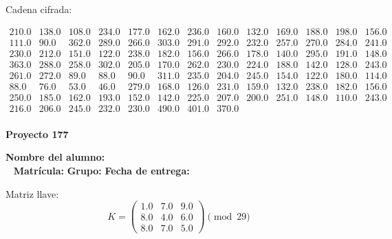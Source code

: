 \documentclass[12pt]{article}
\begin{document}
Cadena cifrada:
\begin{center}
$\begin{array}{lllllllllllll}
210.0 & 138.0 & 108.0 & 234.0 & 177.0 & 162.0 & 236.0 & 160.0 & 132.0 & 169.0 & 188.0 & 198.0 & 156.0\\
111.0 & 90.0 & 362.0 & 289.0 & 266.0 & 303.0 & 291.0 & 292.0 & 232.0 & 257.0 & 270.0 & 284.0 & 241.0\\
230.0 & 212.0 & 151.0 & 122.0 & 238.0 & 182.0 & 156.0 & 266.0 & 178.0 & 140.0 & 295.0 & 191.0 & 148.0\\
363.0 & 288.0 & 258.0 & 302.0 & 205.0 & 170.0 & 262.0 & 230.0 & 224.0 & 188.0 & 142.0 & 128.0 & 243.0\\
261.0 & 272.0 & 89.0 & 88.0 & 90.0 & 311.0 & 235.0 & 204.0 & 245.0 & 154.0 & 122.0 & 180.0 & 114.0\\
88.0 & 76.0 & 53.0 & 46.0 & 279.0 & 168.0 & 126.0 & 231.0 & 159.0 & 132.0 & 238.0 & 182.0 & 156.0\\
250.0 & 185.0 & 162.0 & 193.0 & 152.0 & 142.0 & 225.0 & 207.0 & 200.0 & 251.0 & 148.0 & 110.0 & 243.0\\
216.0 & 206.0 & 245.0 & 232.0 & 230.0 & 490.0 & 401.0 & 370.0\\
\end{array}$
\end{center}

\newpage


\textbf{Proyecto 177}

\textbf{Nombre del alumno:} \underline{\hspace{13cm}}\\\
\vspace{1cm}
\textbf{Matrícula:} \underline{\hspace{4cm}} \hspace{1cm}
\textbf{Grupo:} \underline{\hspace{2cm}}
\textbf{Fecha de entrega:} \underline{\hspace{2cm}}

\medskip

Matriz llave:
\[
K = \begin{pmatrix}
1.0 & 7.0 & 9.0\\
8.0 & 4.0 & 6.0\\
8.0 & 7.0 & 5.0
\end{pmatrix} \pmod{29}
\]
\end{document}
